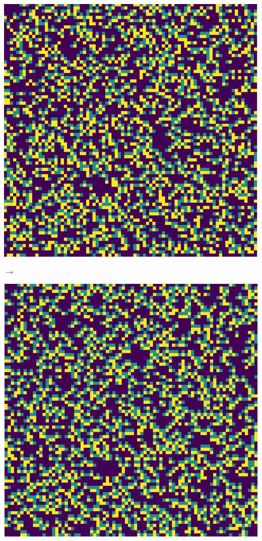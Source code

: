 \documentclass[12pt, a4paper]{article}
\begin{document}
\begin{center}
\begin{minipage}{.17\linewidth}
                \includegraphics[scale=0.15]{img/part1/step2.png}
            \end{minipage}
            $\rightarrow$
            \begin{minipage}{.17\linewidth}
                \includegraphics[scale=0.15]{img/part1/step3.png}

\end{minipage}
\end{center}
\end{document}
